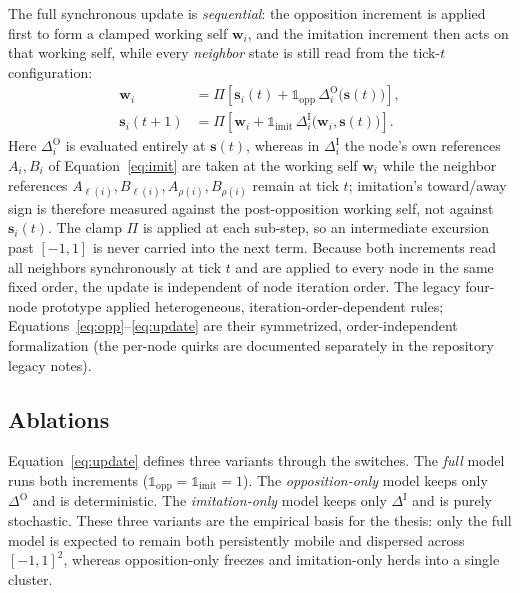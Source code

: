 \documentclass[11pt]{article}
\newcommand{\clamp}{\Pi}
\newcommand{\stvec}{\mathbf{s}}
\begin{document}
The full synchronous update is \emph{sequential}: the opposition increment is applied first to form a clamped
working self $\mathbf{w}_i$, and the imitation increment then acts on that working self, while every \emph{neighbor}
state is still read from the tick-$t$ configuration:
\begin{equation}
\begin{aligned}
\mathbf{w}_i &= \clamp\!\left[\stvec_i(t)+\mathbb{1}_{\mathrm{opp}}\,\Delta^{\mathrm{O}}_i\!\bigl(\stvec(t)\bigr)\right],\\[2pt]
\stvec_i(t+1) &= \clamp\!\left[\mathbf{w}_i+\mathbb{1}_{\mathrm{imit}}\,\Delta^{\mathrm{I}}_i\!\bigl(\mathbf{w}_i,\stvec(t)\bigr)\right].
\end{aligned}
\label{eq:update}
\end{equation}
Here $\Delta^{\mathrm{O}}_i$ is evaluated entirely at $\stvec(t)$, whereas in $\Delta^{\mathrm{I}}_i$ the node's own
references $A_i,B_i$ of Equation~\eqref{eq:imit} are taken at the working self $\mathbf{w}_i$ while the neighbor
references $A_{\ell(i)},B_{\ell(i)},A_{\rho(i)},B_{\rho(i)}$ remain at tick $t$; imitation's toward/away sign is
therefore measured against the post-opposition working self, not against $\stvec_i(t)$. The clamp $\clamp$ is applied
at each sub-step, so an intermediate excursion past $[-1,1]$ is never carried into the next term. Because both
increments read all neighbors synchronously at tick $t$ and are applied to every node in the same fixed order, the
update is independent of node iteration order.
The legacy four-node prototype applied heterogeneous, iteration-order-dependent rules;
Equations~\eqref{eq:opp}--\eqref{eq:update} are their symmetrized, order-independent formalization (the per-node
quirks are documented separately in the repository legacy notes).

\subsection{Ablations}
Equation~\eqref{eq:update} defines three variants through the switches. The \emph{full} model runs both increments
($\mathbb{1}_{\mathrm{opp}}=\mathbb{1}_{\mathrm{imit}}=1$). The \emph{opposition-only} model keeps only
$\Delta^{\mathrm{O}}$ and is deterministic. The \emph{imitation-only} model keeps only $\Delta^{\mathrm{I}}$ and is
purely stochastic. These three variants are the empirical basis for the thesis: only the full model is expected to
remain both persistently mobile and dispersed across $[-1,1]^2$, whereas opposition-only freezes and imitation-only
herds into a single cluster.
\end{document}
